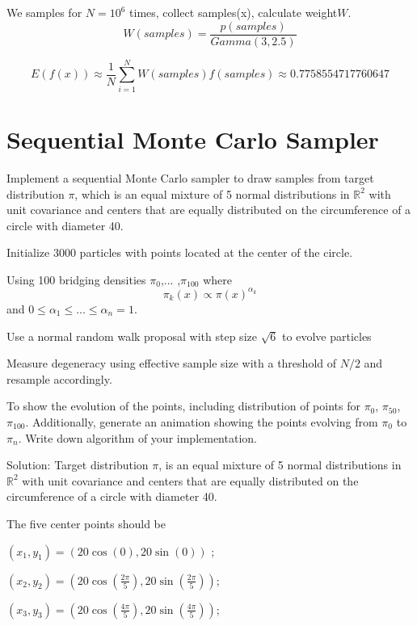 \documentclass{article}
\begin{document}
We samples for $N = 10^6$ times, collect samples(x), calculate weight$W$.
\begin{equation}
    W(samples) = \frac{p(samples)}{Gamma(3,2.5)}
\end{equation}

\begin{equation}
    E(f(x)) \approx \frac{1}{N}\sum_{i=1}^{N}W(samples)f(samples) \approx 0.7758554717760647
\end{equation}



\newpage
\section{Sequential Monte Carlo Sampler}
Implement a sequential Monte Carlo sampler to draw samples from target distribution $\pi$, which is an equal mixture of 5 normal distributions in $\mathbb{R}^2$ with unit covariance and centers that are equally distributed on the circumference of a circle with diameter 40.

Initialize 3000 particles with points located at the center of the circle.

Using 100 bridging densities $\pi_{0}$,... ,$\pi_{100}$ where
\begin{equation}
    \pi_{k}(x) \propto \pi(x)^{\alpha_{k}}
\end{equation}
and $0 \leq \alpha_{1} \leq ... \leq \alpha_{n} = 1$.

Use a normal random walk proposal with step size $\sqrt{6}$ to evolve particles

Measure degeneracy using effective sample size with a threshold of $N/2$ and resample accordingly.

To show the evolution of the points, including distribution of points for $\pi_{0}$, $\pi_{50}$, $\pi_{100}$. Additionally, generate an animation showing the points evolving from $\pi_{0}$ to $\pi_{n}$. Write down algorithm of your implementation.

Solution:
Target distribution $\pi$, is an equal mixture of 5 normal distributions in $\mathbb{R}^2$ with unit covariance and centers that are equally distributed on the circumference of a circle with diameter 40.

The five center points should be

$(x_1,y_1) = (20\cos(0),20 \sin(0))$ ; 

$(x_2,y_2) = (20\cos(\frac{2\pi}{5}),20 \sin(\frac{2\pi}{5}))$; 

$(x_3,y_3) = (20\cos(\frac{4\pi}{5}),20 \sin(\frac{4\pi}{5}))$; 
\end{document}
